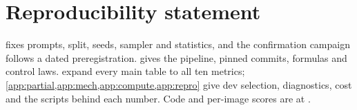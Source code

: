 \section*{Reproducibility statement}\label{sec:repro}
 fixes prompts, split, seeds, sampler and statistics, and the confirmation campaign follows a dated preregistration.  gives the pipeline, pinned commits, formulas and control laws.  expand every main table to all ten metrics; \cref{app:partial,app:mech,app:compute,app:repro} give dev selection, diagnostics, cost and the scripts behind each number. Code and per-image scores are at \codeurl.
